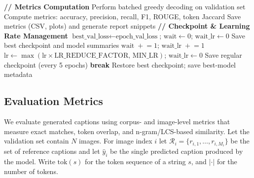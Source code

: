 \begin{algorithm}[htbp]
\begin{algorithmic}[1]
        \State \textbf{// Metrics Computation}
        \State Perform batched greedy decoding on validation set
        \State Compute metrics: accuracy, precision, recall, F1, ROUGE, token Jaccard
        \State Save metrics (CSV, plots) and generate report snippets
        \State \textbf{// Checkpoint \& Learning Rate Management}
            \State $\text{best\_val\_loss} \gets \text{epoch\_val\_loss}$; $\text{wait} \gets 0$; $\text{wait\_lr} \gets 0$
            \State Save best checkpoint and model summaries
        \Else
            \State $\text{wait} \;+\!\!= 1$; $\text{wait\_lr} \;+\!\!= 1$
                \State $\text{lr} \gets \max(\text{lr} \times \text{LR\_REDUCE\_FACTOR},\,\text{MIN\_LR})$; $\text{wait\_lr} \gets 0$
            \EndIf
        \EndIf
        \State Save regular checkpoint (every 5 epochs)
            \State \textbf{break} 
        \EndIf
    \EndFor
    \State Restore best checkpoint; save best-model metadata
\end{algorithmic}
\end{algorithm}

\subsection{Evaluation Metrics}

We evaluate generated captions using corpus- and image-level metrics that measure exact matches, token overlap, and n-gram/LCS-based similarity. Let the validation set contain $N$ images. For image index $i$ let $\mathcal{R}_i = \{r_{i,1},\dots,r_{i,M_i}\}$ be the set of reference captions and let $\hat{y}_i$ be the single predicted caption produced by the model. Write $\mathrm{tok}(s)$ for the token sequence of a string $s$, and $|\cdot|$ for the number of tokens.

